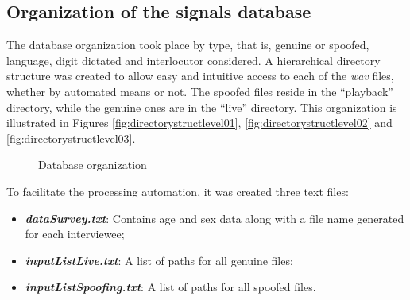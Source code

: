 	\subsection{Organization of the signals database}
		\par The database organization took place by type, that is, genuine or spoofed, language, digit dictated and interlocutor considered. A hierarchical directory structure was created to allow easy and intuitive access to each of the \textit{wav} files, whether by automated means or not. The spoofed files reside in the ``playback'' directory, while the genuine ones are in the ``live'' directory. This organization is illustrated in Figures \ref{fig:directorystructlevel01}, \ref{fig:directorystructlevel02} and \ref{fig:directorystructlevel03}.		
		\begin{figure}[ht]
			\centering
			\caption{Database organization}
			\label{fig:directorystructlevel010203}
		\end{figure}
		
		\par To facilitate the processing automation, it was created three text files:
		\begin{itemize}
			\item \textit{\textbf{dataSurvey.txt}}: Contains age and sex data along with a file name generated for each interviewee;
			\item \textit{\textbf{inputListLive.txt}}: A list of paths for all genuine files;
			\item \textit{\textbf{inputListSpoofing.txt}}: A list of paths for all spoofed files.
		\end{itemize}
	
